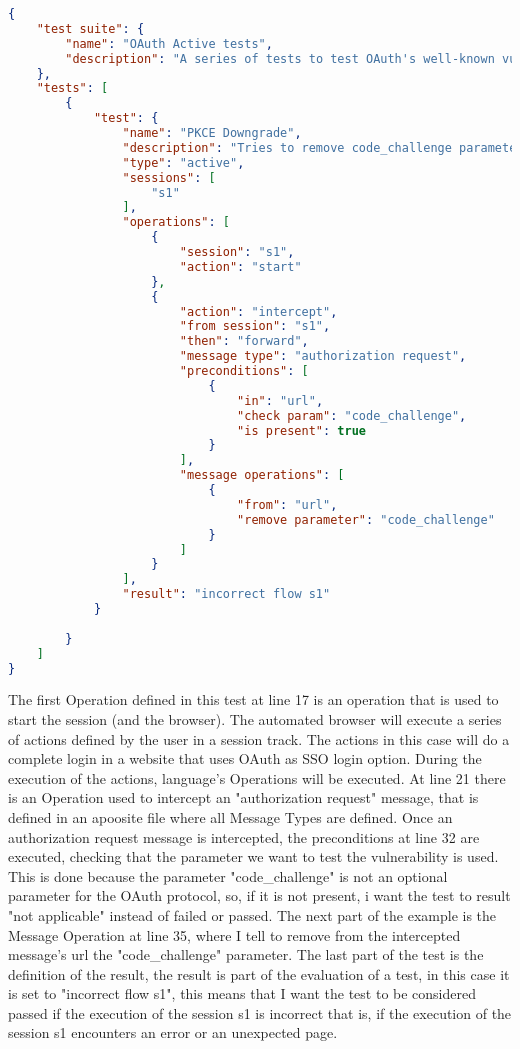 \begin{lstlisting}[language=json]
{
    "test suite": {
        "name": "OAuth Active tests",
        "description": "A series of tests to test OAuth's well-known vulnerabilities"
    },
    "tests": [    
        {
            "test": {
                "name": "PKCE Downgrade",
                "description": "Tries to remove code_challenge parameter",
                "type": "active",
                "sessions": [
                    "s1"
                ],
                "operations": [
                    {
                        "session": "s1",
                        "action": "start"
                    },
                    {
                        "action": "intercept",
                        "from session": "s1",
                        "then": "forward",
                        "message type": "authorization request",
                        "preconditions": [
                            {
                                "in": "url",
                                "check param": "code_challenge",
                                "is present": true
                            }
                        ],
                        "message operations": [
                            {
                                "from": "url",
                                "remove parameter": "code_challenge"
                            }
                        ]
                    }
                ],
                "result": "incorrect flow s1"
            }
    
        }
    ]
}
\end{lstlisting}

The first Operation defined in this test at line 17 is an operation that is used to start the session (and the browser). The automated browser will execute a series of actions defined by the user in a session track. The actions in this case will do a complete login in a website that uses OAuth as SSO login option. During the execution of the actions, language's Operations will be executed. At line 21 there is an Operation used to intercept an "authorization request" message, that is defined in an apoosite file where all Message Types are defined. Once an authorization request message is intercepted, the preconditions at line 32 are executed, checking that the parameter we want to test the vulnerability is used. This is done because the parameter "code\_challenge" is not an optional parameter for the OAuth protocol, so, if it is not present, i want the test to result "not applicable" instead of failed or passed.
The next part of the example is the Message Operation at line 35, where I tell to remove from the intercepted message's url the "code\_challenge" parameter.
The last part of the test is the definition of the result, the result is part of the evaluation of a test, in this case it is set to "incorrect flow s1", this means that I want the test to be considered passed if the execution of the session s1 is incorrect that is, if the execution of the session s1 encounters an error or an unexpected page.


